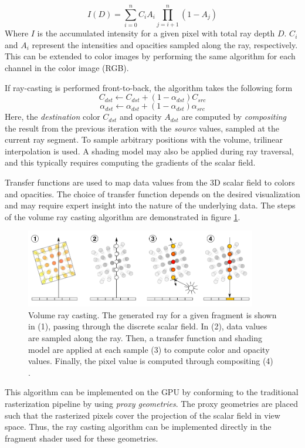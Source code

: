 \documentclass{article}
\begin{document}
$$ I(D) = \sum_{i=0}^n C_iA_i\prod_{j=i+1}^{n}(1-A_j)$$
Where $I$ is the accumulated intensity for a given pixel with total ray depth $D$.
$C_i$ and $A_i$ represent the intensities and opacities sampled along the ray, respectively. This
can be extended to color images by performing the same algorithm for each channel in the color image (RGB).

If ray-casting is performed front-to-back, the algorithm takes the following form \cite{Kruger2006GPU}
$$ C_{dst} \leftarrow C_{dst} + (1-\alpha_{dst})C_{src} $$
$$ \alpha_{dst} \leftarrow \alpha_{dst} + (1-\alpha_{dst})\alpha_{src}$$
Here, the \textit{destination} color $C_{dst}$ and opacity $A_{dst}$ are computed by 
\textit{compositing} the result from the previous iteration with the \textit{source} values, sampled at the current ray segment. To sample arbitrary positions with the volume, trilinear interpolation is used. A shading model may also be applied during ray traversal,
and this typically requires computing the gradients of the scalar field.

Transfer functions are used to map data values from the 3D scalar field to colors and opacities. The choice of transfer function
depends on the desired visualization and may require expert insight into the nature of the underlying data.
The steps of the volume ray casting algorithm are demonstrated in figure \ref{fig:volumeRayCasting}.


\begin{figure}[tbh]
    \centering
    \includegraphics[width=0.9\textwidth]{images/Volume_ray_casting.png}
    \caption{Volume ray casting. The generated ray for a given fragment is shown in (1), passing through the discrete scalar field. In (2), data values are sampled along the ray. Then, a transfer function and shading model are applied at each sample (3) to compute color and opacity values. Finally, the pixel value
    is computed through compositing (4) \cite{Hofmann2011}.}
    \label{fig:volumeRayCasting}
\end{figure}

This algorithm can be implemented on the GPU by conforming to the traditional rasterization pipeline by using \textit{proxy geometries}.
The proxy geometries are placed such that the rasterized pixels cover the projection of the scalar field in view space. Thus,
the ray casting algorithm can be implemented directly in the fragment shader used for these geometries. 
\end{document}
